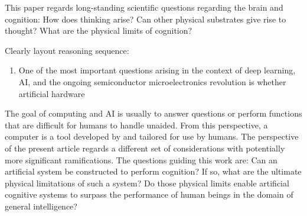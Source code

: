 \vspace{3em}
This paper regards long-standing scientific questions regarding the brain and cognition: How does thinking arise? Can other physical substrates give rise to thought? What are the physical limits of cognition?

\vspace{3em}
\cite{sisc2017}

\vspace{3em}
Clearly layout reasoning sequence:
\begin{enumerate}
\item One of the most important questions arising in the context of deep learning, AI, and the ongoing semiconductor microelectronics revolution is whether artificial hardware
\end{enumerate}

\vspace{3em}
The goal of computing and AI is usually to answer questions or perform functions that are difficult for humans to handle unaided. From this perspective, a computer is a tool developed by and tailored for use by humans. The perspective of the present article regards a different set of considerations with potentially more significant ramifications. The questions guiding this work are: Can an artificial system be constructed to perform cognition? If so, what are the ultimate physical limitations of such a system? Do those physical limits enable artificial cognitive systems to surpass the performance of human beings in the domain of general intelligence?